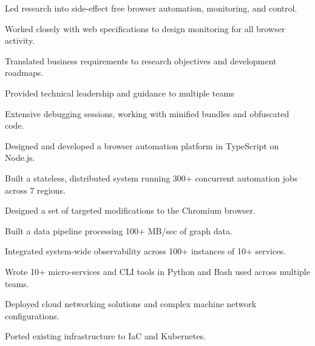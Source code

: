 \documentclass[a4paper,11pt]{article}
\begin{document}
\begin{sectionList}

    \begin{jobReflectizLead}
        \item Led research into side-effect free browser automation, monitoring, and control.
        \item Worked closely with web specifications to design monitoring for all browser activity.
        \item Translated business requirements to research objectives and development roadmaps.
        \item Provided technical leadership and guidance to multiple teams
        \item Extensive debugging sessions, working with minified bundles and obfuscated code.
        \item Designed and developed a browser automation platform in TypeScript on Node.js.
        \item Built a stateless, distributed system running 300+ concurrent automation jobs across 7 regions.
        \item Designed a set of targeted modifications to the Chromium browser.
        \item Built a data pipeline processing 100+ MB/sec of graph data.
        \item Integrated system-wide observability across 100+ instances of 10+ services.
        \item Wrote 10+ micro-services and CLI tools in Python and Bash used across multiple teams.
        \item Deployed cloud networking solutions and complex machine network configurations.
        \item Ported existing infrastructure to IaC and Kubernetes.



\end{jobReflectizLead}
\end{sectionList}
\end{document}
